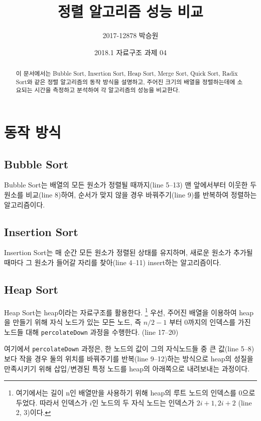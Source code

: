 \documentclass{article}
\title{정렬 알고리즘 성능 비교}
\date{%
	2018.1 자료구조 과제 04%
}
\author{%
2017-12878 박승원%
}
\begin{document}
	\maketitle
	\begin{abstract}
		이 문서에서는 Bubble Sort, Insertion Sort, Heap Sort, Merge Sort,
		Quick Sort, Radix Sort와 같은 정렬 알고리즘의 동작 방식을 설명하고,
		주어진 크기의 배열을 정렬하는데에 소요되는 시간을 측정하고 분석하여
		각 알고리즘의 성능을 비교한다.
	\end{abstract}

 	\section{동작 방식}
 	
 	\subsection{Bubble Sort}
 	Bubble Sort는 배열의 모든 원소가 정렬될 때까지(line 5--13)
 	맨 앞에서부터 이웃한 두 원소를 비교(line 8)하여,
 	순서가 맞지 않을 경우 바꿔주기(line 9)를 반복하여 정렬하는 알고리즘이다.
 	
	\clearpage
	
	\subsection{Insertion Sort}
	Insertion Sort는 매 순간 모든 원소가 정렬된 상태를 유지하며,
	새로운 원소가 추가될 때마다 그 원소가 들어갈 자리를 찾아(line 4--11)
	insert하는 알고리즘이다.
	
	\clearpage
	
	\subsection{Heap Sort}
	Heap Sort는 heap이라는 자료구조를 활용한다.%
	\footnote{
		여기에서는 길이 n인 배열만을 사용하기 위해
		heap의 루트 노드의 인덱스를 0으로 두었다.
		따라서 인덱스가 $ i $인 노드의 두 자식 노드는
		인덱스가 $ 2i+1, 2i+2 $ (line 2, 3)이다.
	}
	우선, 주어진 배열을 이용하여 heap을 만들기 위해 
	자식 노드가 있는 모든 노드, 즉 $ n/2-1 $ 부터 0까지의
	인덱스를 가진 노드들 대해 \texttt{percolateDown}
	과정을 수행한다. (line 17--20)
	
	여기에서 \texttt{percolateDown} 과정은,
	한 노드의 값이 그의 자식노드들 중 큰 값(line 5--8)보다
	작을 경우 둘의 위치를 바꿔주기를 반복(line 9--12)하는 방식으로
	heap의 성질을 만족시키기 위해
	삽입/변경된 특정 노드를 heap의 아래쪽으로 내려보내는 과정이다.
	
\end{document}
